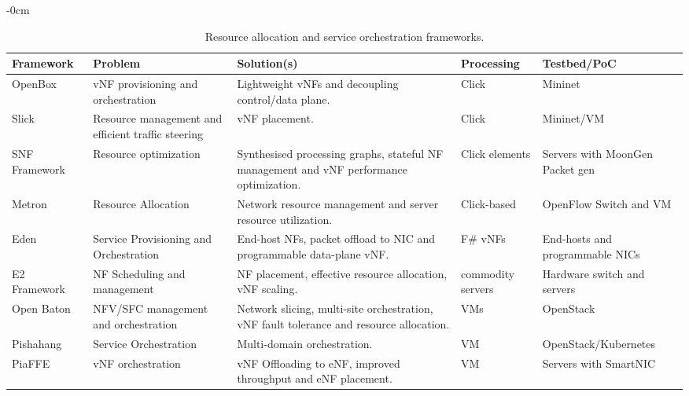 \documentclass[futureinternet,review,accept,pdftex,moreauthors]{Definitions/mdpi}
\begin{document}
\begin{table}[H]
\caption{Resource allocation and service orchestration frameworks.}
\label{Resource-Allocation-Table}
\footnotesize
	\begin{adjustwidth}{-\extralength}{0cm}
		\begin{tabularx}{\fulllength}{CCCCC}
\toprule
\textbf{Framework} & \textbf{Problem} & \textbf{Solution(s)} & \textbf{Processing} & \textbf{Testbed/PoC} \\ \midrule


OpenBox~\cite{bremler2016openbox} & vNF provisioning and orchestration  & Lightweight vNFs and decoupling control/data plane. & Click & Mininet \\ %

Slick~\cite{anwer2015programming} & Resource management and efficient traffic steering &vNF placement. & Click & Mininet/VM \\

SNF Framework~\cite{katsikas2016snf} & Resource optimization &  Synthesised processing graphs, stateful NF management and vNF performance optimization.  & Click elements & Servers with MoonGen Packet gen \\ %


Metron~\cite{katsikas2018metron} & Resource Allocation &  Network resource management and server resource utilization. & Click-based & OpenFlow Switch and VM \\ %

Eden~\cite{ballani2015enabling} & Service Provisioning and Orchestration &  End-host NFs, packet offload to NIC and programmable data-plane vNF.  & F\# vNFs & End-hosts and programmable NICs \\ %

E2 Framework~\cite{palkar2015e2} & NF Scheduling and management &  NF placement, effective resource allocation, vNF scaling.  & commodity servers & Hardware switch and servers \\ %

Open Baton~\cite{carella2015open} & NFV/SFC management and orchestration & Network slicing, multi-site orchestration, vNF fault tolerance and resource allocation.  & VMs & OpenStack \\ %

Pishahang~\cite{kouchaksaraei2018pishahang} & Service Orchestration & Multi-domain orchestration.  & VM & OpenStack/Kubernetes \\ %

PiaFFE~\cite{mafioletti2020piaffe} & vNF orchestration & vNF Offloading to eNF, improved throughput and eNF placement. & VM & Servers with SmartNIC \\ %




	\bottomrule
		\end{tabularx}
	\end{adjustwidth}
\end{table}
\end{document}
